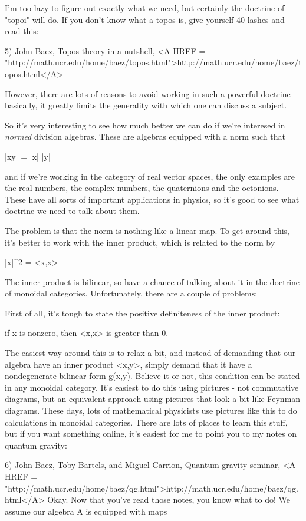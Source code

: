 I'm too lazy to figure out exactly what we need, but certainly the
doctrine of "topoi" will do.  If you don't know what a topos is, give
yourself 40 lashes and read this:

5) John Baez, Topos theory in a nutshell,
<A HREF = "http://math.ucr.edu/home/baez/topos.html">http://math.ucr.edu/home/baez/topos.html</A>

However, there are lots of reasons to avoid working in such a powerful
doctrine - basically, it greatly limits the generality with which one
can discuss a subject.  

So it's very interesting to see how much better we can do if we're
interesed in \emph{normed} division algebras.  These are algebras equipped
with a norm such that

|xy| = |x| |y|

and if we're working in the category of real vector spaces, the only
examples are the real numbers, the complex numbers, the quaternions
and the octonions.  These have all sorts of important applications in
physics, so it's good to see what doctrine we need to talk about them.

The problem is that the norm is nothing like a linear map.  To get
around this, it's better to work with the inner product, which is
related to the norm by

|x|^{2} = <x,x>  

The inner product is bilinear, so have a chance of talking about it in
the doctrine of monoidal categories.  Unfortunately, there are a couple
of problems:

First of all, it's tough to state the positive definiteness of the inner
product:

if x is nonzero, then <x,x> is greater than 0.

The easiest way around this is to relax a bit, and instead of demanding
that our algebra have an inner product <x,y>, simply demand that it have
a nondegenerate bilinear form g(x,y).  Believe it or not, this condition
can be stated in any monoidal category.  It's easiest to do this using
pictures - not commutative diagrams, but an equivalent approach using
pictures that look a bit like Feynman diagrams.  These days, lots of
mathematical physicists use pictures like this to do calculations in
monoidal categories.  There are lots of places to learn this stuff, but
if you want something online, it's easiest for me to point you to my notes
on quantum gravity:

6) John Baez, Toby Bartels, and Miguel Carrion, Quantum gravity 
seminar, <A HREF = "http://math.ucr.edu/home/baez/qg.html">http://math.ucr.edu/home/baez/qg.html</A>
Okay.  Now that you've read those notes, you know what to do!
We assume our algebra A is equipped with maps 

